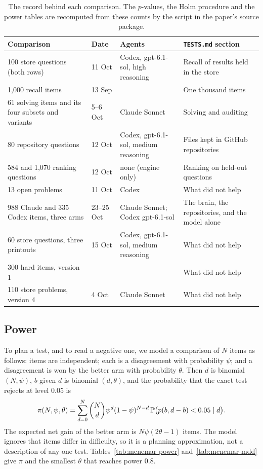 \begin{table}[ht]
\centering\small
\begin{tabular}{p{5.2cm}lp{3.3cm}p{3.6cm}}
\toprule
Comparison & Date & Agents & \texttt{TESTS.md} section\\
\midrule
100 store questions (both rows) & 11 Oct & Codex, gpt-6.1-sol, high reasoning & Recall of results held in the store\\
1{,}000 recall items & 13 Sep & & One thousand items\\
61 solving items and its four subsets and variants & 5--6 Oct & Claude Sonnet & Solving and auditing\\
80 repository questions & 12 Oct & Codex, gpt-6.1-sol, medium reasoning & Files kept in GitHub repositories\\
584 and 1{,}070 ranking questions & 12 Oct & none (engine only) & Ranking on held-out questions\\
13 open problems & 11 Oct & Codex & What did not help\\
988 Claude and 335 Codex items, three arms & 23--25 Oct & Claude Sonnet; Codex gpt-6.1-sol & The brain, the repositories, and the model alone\\
60 store questions, three printouts & 15 Oct & Codex, gpt-6.1-sol, medium reasoning & What did not help\\
300 hard items, version 1 & & & What did not help\\
110 store problems, version 4 & 4 Oct & Claude Sonnet & What did not help\\
\bottomrule
\end{tabular}
\caption{The record behind each comparison. The $p$-values, the Holm procedure and the power tables are recomputed from these counts by the script in the paper's source package.}
\label{tab:ledger}
\end{table}

\subsection{Power}
To plan a test, and to read a negative one, we model a comparison of $N$ items as follows: items are independent; each is a disagreement with probability $\psi$; and a disagreement is won by the better arm with probability $\theta$. Then $d$ is binomial $(N,\psi)$, $b$ given $d$ is binomial $(d,\theta)$, and the probability that the exact test rejects at level $0.05$ is
\[
\pi(N,\psi,\theta)=\sum_{d=0}^{N}\binom{N}{d}\psi^d(1-\psi)^{N-d}\,\mathbb{P}\bigl(p(b,d-b)<0.05\mid d\bigr).
\]
The expected net gain of the better arm is $N\psi(2\theta-1)$ items. The model ignores that items differ in difficulty, so it is a planning approximation, not a description of any one test. Tables~\ref{tab:mcnemar-power} and~\ref{tab:mcnemar-mdd} give $\pi$ and the smallest $\theta$ that reaches power $0.8$.

